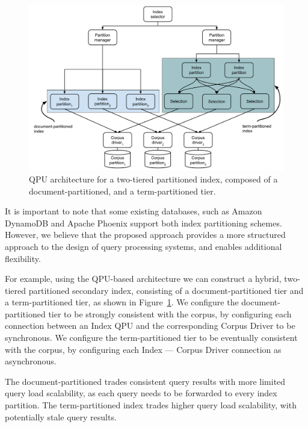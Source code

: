 \begin{figure}
  \centering
    \includegraphics[width=\textwidth]{./figures/case_studies/index_partitioned_two_level.pdf}
  \caption{QPU architecture for a two-tiered partitioned index, composed of a document-partitioned, and a term-partitioned tier.}
  \label{fig:index_partitioned_two_level}
\end{figure}

It is important to note that some existing databases,
such as Amazon DynamoDB \cite{dynamodb:secondaryindexes} and Apache Phoenix \cite{phoenix:secondaryidnexing}
support both index partitioning schemes.
However, we believe that the proposed approach provides a more structured approach to the design of query processing systems,
and enables additional flexibility.

\medskip
\noindent
For example, using the QPU-based architecture we can construct a hybrid, two-tiered partitioned secondary index,
consisting of a document-partitioned tier and a term-partitioned tier, as shown in Figure~\ref{fig:index_partitioned_two_level}.
We configure the document-partitioned tier to be strongly consistent with the corpus,
by configuring each connection between an Index QPU and the corresponding Corpus Driver to be synchronous.
We configure the term-partitioned tier to be eventually consistent with the corpus,
by configuring each Index --- Corpus Driver connection as asynchronous.

The document-partitioned trades consistent query results with more limited query load scalability,
as each query needs to be forwarded to every index partition.
The term-partitioned index trades higher query load scalability, with potentially stale query results.

